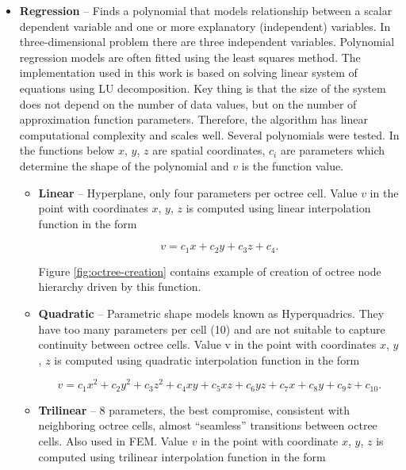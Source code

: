 \begin{itemize}
  \item \textbf{Regression} -- Finds a polynomial that models relationship between a scalar dependent variable and one or more explanatory (independent) variables. In three-dimensional problem there are three independent variables. Polynomial regression models are often fitted using the least squares method. The implementation used in this work is based on solving linear system of equations using LU decomposition. Key thing is that the size of the system does not depend on the number of data values, but on the number of approximation function parameters. Therefore, the algorithm has linear computational complexity and scales well. Several polynomials were tested. In the functions below $x$, $y$, $z$ are spatial coordinates, $c_i$ are parameters which determine the shape of the polynomial and $v$ is the function value.

  \begin{itemize}
    \item \textbf{Linear} -- Hyperplane, only four parameters per octree cell. Value $v$ in the point with coordinates $x$, $y$, $z$ is computed using linear interpolation function in the form
    
    \begin{equation}
    v=c_{1}x + c_{2}y + c_{3}z + c_{4}.
    \end{equation}
    
    Figure \ref{fig:octree-creation} contains example of creation of octree node hierarchy driven by this function.
    
    \item \textbf{Quadratic} -- Parametric shape models known as Hyperquadrics. They have too many parameters per cell (10) and are not suitable to capture continuity between octree cells. Value v in the point with coordinates $x$, $y$, $z$ is computed using quadratic interpolation function in the form

    \begin{equation}
      v=c_{1}x^2 + c_{2}y^2 + c_{3}z^2 + c_{4}xy + c_{5}xz + c_{6}yz + c_{7}x + c_{8}y + c_{9}z + c_{10}.
    \end{equation}

    \item \textbf{Trilinear} -- 8 parameters, the best compromise, consistent with neighboring octree cells, almost “seamless” transitions between octree cells. Also used in FEM. Value $v$ in the point with coordinate $x$, $y$, $z$ is computed using trilinear interpolation function in the form
    

\end{itemize}
\end{itemize}
